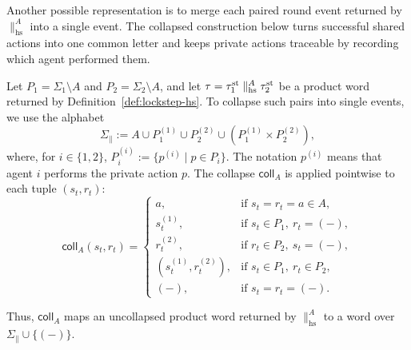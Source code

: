 Another possible representation is to merge each paired round event returned by \(\parallel_{\mathrm{hs}}^{A}\) into a single event. The collapsed construction below turns successful shared actions into one common letter and keeps private actions traceable by recording which agent performed them.

\begin{definition}\label{def:collapsed-hs}
Let \(P_1=\Sigma_1\setminus A\) and \(P_2=\Sigma_2\setminus A\), and let \(\tau=\tau^{\mathrm{st}}_1\parallel_{\mathrm{hs}}^{A}\tau^{\mathrm{st}}_2\) be a product word returned by Definition~\ref{def:lockstep-hs}.
To collapse such pairs into single events, we use the alphabet
\[
\Sigma_{\parallel}:=A\cup P_1^{(1)}\cup P_2^{(2)}\cup(P_1^{(1)}\times P_2^{(2)}),
\]
where, for \(i\in\{1,2\}\), \(P_i^{(i)}:=\{p^{(i)}\mid p\in P_i\}\). The notation \(p^{(i)}\) means that agent \(i\) performs the private action \(p\). The collapse \(\mathsf{coll}_A\) is applied pointwise to each tuple \((s_t,r_t)\):
\[
\mathsf{coll}_A(s_t,r_t)=
\begin{cases}
a, & \text{if } s_t=r_t=a\in A,\\
s_t^{(1)}, & \text{if } s_t\in P_1,\ r_t=(-),\\
r_t^{(2)}, & \text{if } r_t\in P_2,\ s_t=(-),\\
(s_t^{(1)},r_t^{(2)}), & \text{if } s_t\in P_1,\ r_t\in P_2,\\
(-), & \text{if } s_t=r_t=(-).
\end{cases}
\]

\end{definition}
Thus, \(\mathsf{coll}_A\) maps an uncollapsed product word returned by \(\parallel_{\mathrm{hs}}^{A}\) to a word over \(\Sigma_{\parallel}\cup\{(-)\}\).
